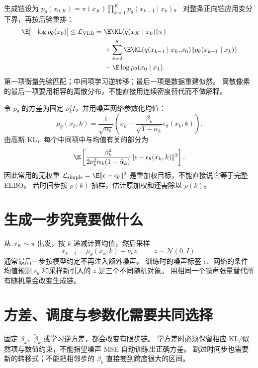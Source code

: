 生成链设为 $p_\theta(x_{0:K})=\pi(x_K)\prod_{k=1}^Kp_\theta(x_{k-1}\mid x_k)$。
对整条正向链应用变分下界，再按后验重排：
\begin{equation}\label{th:ddpm-elbo}
\begin{aligned}
\E[-\log p_\theta(x_0)]\leq\mathcal L_{\rm VLB}
={}&\E\KL(q(x_K\mid x_0)\Vert\pi)\\
&+\sum_{k=2}^K\E\KL(q(x_{k-1}\mid x_k,x_0)\Vert
 p_\theta(x_{k-1}\mid x_k))\\
&-\E\log p_\theta(x_0\mid x_1).
\end{aligned}
\end{equation}
第一项衡量先验匹配；中间项学习逆转移；最后一项是数据重建似然。
离散像素的最后一项要用相容的离散分布，不能直接用连续密度替代而不做解释。

令 $p_\theta$ 的方差为固定 $\nu_k^2I$，并用噪声网络参数化均值：
\[
\mu_\theta(x_k,k)=\frac1{\sqrt{\alpha_k}}
 \left(x_k-\frac{\beta_k}{\sqrt{1-\bar\alpha_k}}\epsilon_\theta(x_k,k)\right).
\]
由高斯 KL，每个中间项中与均值有关的部分为
\begin{equation}\label{th:ddpm-weight}
\E\left[\frac{\beta_k^2}{2\nu_k^2\alpha_k(1-\bar\alpha_k)}
 \|\epsilon-\epsilon_\theta(x_k,k)\|^2\right].
\end{equation}
因此常用的无权重 $\mathcal L_{\rm simple}=\E\|\epsilon-\epsilon_\theta\|^2$
是重加权目标，不能直接说它等于完整 ELBO。
若时间步按 $\rho(k)$ 抽样，估计原加权和还需除以 $\rho(k)$。

\section{生成一步究竟要做什么}

从 $x_K\sim\pi$ 出发，按 $k$ 递减计算均值，然后采样
\[
x_{k-1}=\mu_\theta(x_k,k)+\nu_k z,
\qquad z\sim\mathcal N(0,I).
\]
通常最后一步按模型约定不再注入额外噪声。
训练时的噪声标签 $\epsilon$、网络的条件均值预测 $\epsilon_\theta$
和采样新引入的 $z$ 是三个不同随机对象。
用相同一个噪声张量替代所有随机量会改变生成链。

\section{方差、调度与参数化需要共同选择}

固定 $\beta_k$、$\tilde\beta_k$ 或学习逆方差，都会改变有限步链。
学方差时必须保留相应 KL/似然项与数值约束，不能指望噪声 MSE 自动训练出正确方差。
跳过时间步也需要新的转移式；不能把相邻步的 $\beta_k$ 直接套到跨度很大的区间。

